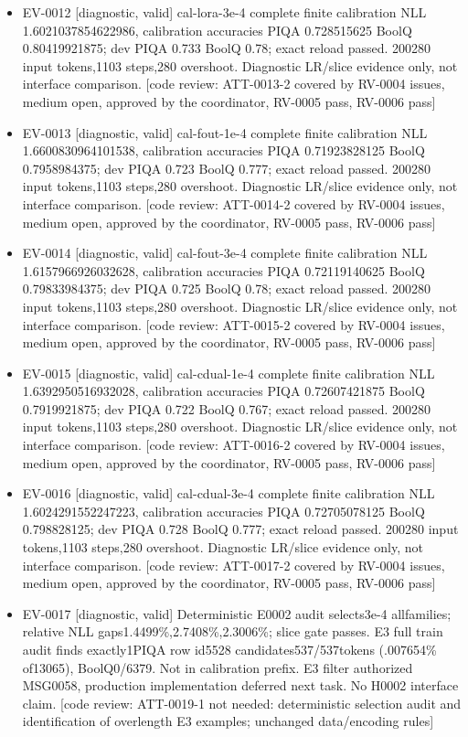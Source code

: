 \documentclass[11pt]{article}
\begin{document}
\begin{itemize}
\item EV-0012 [diagnostic, valid] cal-lora-3e-4 complete finite calibration NLL 1.6021037854622986, calibration accuracies PIQA 0.728515625 BoolQ 0.80419921875; dev PIQA 0.733 BoolQ 0.78; exact reload passed. 200280 input tokens,1103 steps,280 overshoot. Diagnostic LR/slice evidence only, not interface comparison. [code review: ATT-0013-2 covered by RV-0004 issues, medium open, approved by the coordinator, RV-0005 pass, RV-0006 pass]
\item EV-0013 [diagnostic, valid] cal-fout-1e-4 complete finite calibration NLL 1.6600830964101538, calibration accuracies PIQA 0.71923828125 BoolQ 0.7958984375; dev PIQA 0.723 BoolQ 0.777; exact reload passed. 200280 input tokens,1103 steps,280 overshoot. Diagnostic LR/slice evidence only, not interface comparison. [code review: ATT-0014-2 covered by RV-0004 issues, medium open, approved by the coordinator, RV-0005 pass, RV-0006 pass]
\item EV-0014 [diagnostic, valid] cal-fout-3e-4 complete finite calibration NLL 1.6157966926032628, calibration accuracies PIQA 0.72119140625 BoolQ 0.79833984375; dev PIQA 0.725 BoolQ 0.78; exact reload passed. 200280 input tokens,1103 steps,280 overshoot. Diagnostic LR/slice evidence only, not interface comparison. [code review: ATT-0015-2 covered by RV-0004 issues, medium open, approved by the coordinator, RV-0005 pass, RV-0006 pass]
\item EV-0015 [diagnostic, valid] cal-cdual-1e-4 complete finite calibration NLL 1.6392950516932028, calibration accuracies PIQA 0.72607421875 BoolQ 0.7919921875; dev PIQA 0.722 BoolQ 0.767; exact reload passed. 200280 input tokens,1103 steps,280 overshoot. Diagnostic LR/slice evidence only, not interface comparison. [code review: ATT-0016-2 covered by RV-0004 issues, medium open, approved by the coordinator, RV-0005 pass, RV-0006 pass]
\item EV-0016 [diagnostic, valid] cal-cdual-3e-4 complete finite calibration NLL 1.6024291552247223, calibration accuracies PIQA 0.72705078125 BoolQ 0.798828125; dev PIQA 0.728 BoolQ 0.777; exact reload passed. 200280 input tokens,1103 steps,280 overshoot. Diagnostic LR/slice evidence only, not interface comparison. [code review: ATT-0017-2 covered by RV-0004 issues, medium open, approved by the coordinator, RV-0005 pass, RV-0006 pass]
\item EV-0017 [diagnostic, valid] Deterministic E0002 audit selects3e-4 allfamilies; relative NLL gaps1.4499\%,2.7408\%,2.3006\%; slice gate passes. E3 full train audit finds exactly1PIQA row id5528 candidates537/537tokens (.007654\% of13065), BoolQ0/6379. Not in calibration prefix. E3 filter authorized MSG0058, production implementation deferred next task. No H0002 interface claim. [code review: ATT-0019-1 not needed: deterministic selection audit and identification of overlength E3 examples; unchanged data/encoding rules]

\end{itemize}
\end{document}

